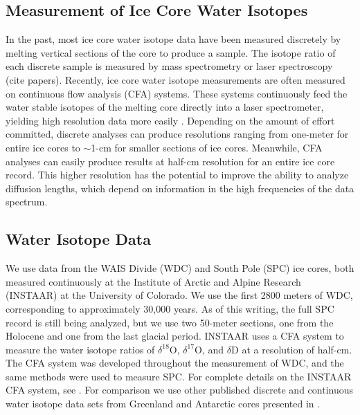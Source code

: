 \documentclass[draft, jgrga]{AGUTeX}
\begin{document}
\begin{article}
\subsection{Measurement of Ice Core Water Isotopes}

In the past, most ice core water isotope data have been measured discretely by melting vertical sections of the core to produce a sample. The isotope ratio of each discrete sample is measured by mass spectrometry or laser spectroscopy (cite papers). Recently, ice core water isotope measurements are often measured on continuous flow analysis (CFA) systems. These systems continuously feed the water stable isotopes of the melting core directly into a laser spectrometer, yielding high resolution data more easily \citep{Gkinis2011a,Emanuelsson2015,Jones2017b}. Depending on the amount of effort committed, discrete analyses can produce resolutions ranging from one-meter for entire ice cores to $\sim$1-cm for smaller sections of ice cores. Meanwhile, CFA analyses can easily produce results at half-cm resolution for an entire ice core record. This higher resolution has the potential to improve the ability to analyze diffusion lengths, which depend on information in the high frequencies of the data spectrum.

\subsection{Water Isotope Data}

We use data from the WAIS Divide (WDC) \citep{Jones2017b} and South Pole (SPC) \citep{Casey2014} ice cores, both measured continuously at the Institute of Arctic and Alpine Research (INSTAAR) at the University of Colorado. We use the first 2800 meters of WDC, corresponding to approximately 30,000 years. As of this writing, the full SPC record is still being analyzed, but we use two 50-meter sections, one from the Holocene and one from the last glacial period. INSTAAR uses a CFA system to measure the water isotope ratios of $\delta^{18}\mathrm{O}$, $\delta^{17}\mathrm{O}$, and $\delta\mathrm{D}$ at a resolution of half-cm. The CFA system was developed throughout the measurement of WDC, and the same methods were used to measure SPC. For complete details on the INSTAAR CFA system, see \citet{Jones2017b}. For comparison we use other published discrete and continuous water isotope data sets from Greenland and Antarctic cores presented in \citet{Oerter2004,Gkinis2011a,Steig2013,Svensson2015,Holme2017}.


\end{article}
\end{document}
